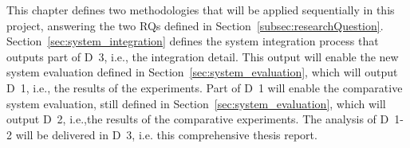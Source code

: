 This chapter defines two methodologies that will be applied sequentially in this project, answering the two \glspl{RQ} defined in Section~\ref{subsec:researchQuestion}. Section~\ref{sec:system_integration} defines the system integration process that outputs part of \gls{D}~3, i.e., the integration detail. This output will enable the new system evaluation defined in Section~\ref{sec:system_evaluation}, which will output \gls{D}~1, i.e., the results of the experiments. Part of \gls{D}~1 will enable the comparative system evaluation, still defined in Section~\ref{sec:system_evaluation}, which will output \gls{D}~2, i.e.,the results of the comparative experiments. The analysis of \gls{D}~1-2 will be delivered in \gls{D}~3, i.e. this comprehensive thesis report.